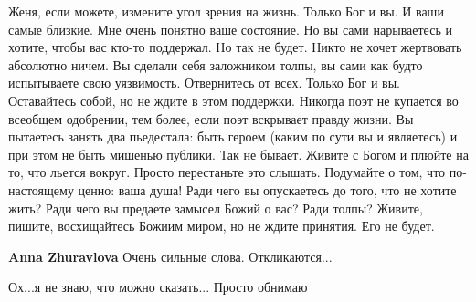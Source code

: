\begin{itemize}
Женя, если можете, измените угол зрения на жизнь. Только Бог и вы. И ваши самые
близкие. Мне очень понятно ваше состояние. Но вы сами нарываетесь и хотите,
чтобы вас кто-то поддержал. Но так не будет. Никто не хочет жертвовать
абсолютно ничем. Вы сделали себя заложником толпы, вы сами как будто
испытываете свою уязвимость. Отвернитесь от всех. Только Бог и вы. Оставайтесь
собой, но не ждите в этом поддержки. Никогда поэт не купается во всеобщем
одобрении, тем более, если поэт вскрывает правду жизни. Вы пытаетесь занять два
пьедестала: быть героем (каким по сути вы и являетесь) и при этом не быть
мишенью публики. Так не бывает. Живите с Богом и плюйте на то, что льется
вокруг. Просто перестаньте это слышать. Подумайте о том, что по-настоящему
ценно: ваша душа! Ради чего вы опускаетесь до того, что не хотите жить? Ради
чего вы предаете замысел Божий о вас? Ради толпы? Живите, пишите, восхищайтесь
Божиим миром, но не ждите принятия. Его не будет.

\textbf{Anna Zhuravlova} Очень сильные слова. Откликаются...

Ох...я не знаю, что можно сказать...
Просто обнимаю

\end{itemize} %

